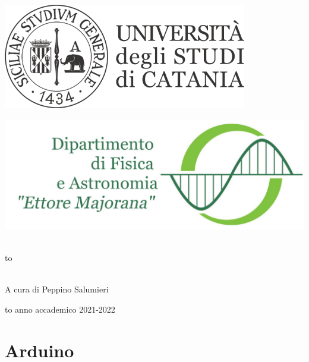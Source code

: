 \documentclass[openany,12pt]{book}
\newcommand\blankpage{%
    \null
    \thispagestyle{empty}%
    \newpage}
\begin{document}
\thispagestyle{empty}
\begin{center}

\begin{minipage}[c]{0.45\textwidth}
\begin{flushleft}
\includegraphics[width=0.8\textwidth]{logo-unict-orizzontale-grigio.png}
\end{flushleft}
\end{minipage}
\hfill
\begin{minipage}[c]{0.45\textwidth}
\begin{flushright}
\includegraphics[width=\textwidth]{logo_dfa_orizzontale}
\end{flushright}
\end{minipage}\\
\medskip
\hbox to \textwidth{\hrulefill}

\vfill
\vfill


\uppercase{}\\

\vfill
\large{A cura di Peppino Salumieri}

\vfill
\vfill
\hbox to \textwidth{\hrulefill}
{\sc anno accademico 2021-2022}
\end{center}

\afterpage{\blankpage}
\newpage

\tableofcontents

\newpage

\chapter{Arduino}
\end{document}
